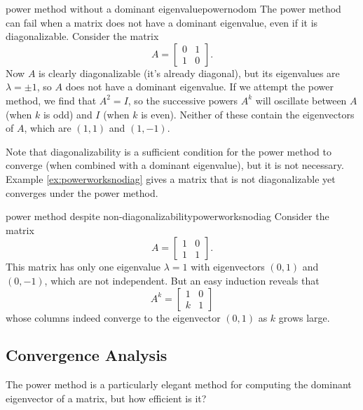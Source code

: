 \documentclass{article}
\begin{document}
\begin{example}{power method without a dominant eigenvalue}{powernodom}
  The power method can fail when a matrix does not have a dominant eigenvalue, even if it is diagonalizable. Consider the matrix
  \begin{equation*}
    A = \begin{bmatrix}0 & 1 \\ 1 & 0\end{bmatrix}.
  \end{equation*}
  Now $A$ is clearly diagonalizable (it's already diagonal), but its eigenvalues are $\lambda = \pm 1$, so $A$ does not have a dominant eigenvalue. If we attempt the power method, we find that $A^2 = I$, so the successive powers $A^k$ will oscillate between $A$ (when $k$ is odd) and $I$ (when $k$ is even). Neither of these contain the eigenvectors of $A$, which are $(1,1)$ and $(1,-1)$.
\end{example}

Note that diagonalizability is a sufficient condition for the power method to converge (when combined with a dominant eigenvalue), but it is not necessary. Example \ref{ex:powerworksnodiag} gives a matrix that is not diagonalizable yet converges under the power method.

\begin{example}{power method despite non-diagonalizability}{powerworksnodiag}
  Consider the matrix
  \begin{equation*}
    A = \begin{bmatrix}1 & 0 \\ 1 & 1\end{bmatrix}.
  \end{equation*}
  This matrix has only one eigenvalue $\lambda = 1$ with eigenvectors $(0,1)$ and $(0,-1)$, which are not independent. But an easy induction reveals that
  \begin{equation*}
    A^k = \begin{bmatrix}1 & 0 \\ k & 1\end{bmatrix}
  \end{equation*}
  whose columns indeed converge to the eigenvector $(0, 1)$ as $k$ grows large.
\end{example}

\subsection{Convergence Analysis}
The power method is a particularly elegant method for computing the dominant eigenvector of a matrix, but how efficient is it?
\end{document}
